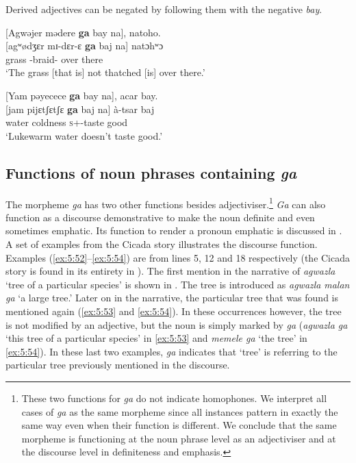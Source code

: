 Derived adjectives can be negated by following them with the negative \textit{bay}. 

\ea \label{ex:5:50}
{}[Agwəjer  mədere  \textbf{ga}  bay   na],  natoho.\\
\gll  {}[agʷødʒɛr  mɪ-dɛr-ɛ  \textbf{ga}  baj  na]  natɔhʷɔ\\
      grass  {\NOM}{}-braid-{\CL}  {\ADJ}  {\NEG}  {\PSP}  {over there}\\
\glt  ‘The grass [that is] not thatched [is] over there.’
\z

\ea \label{ex:5:51}
{}[Yam  pəyecece  \textbf{ga}  bay   na],  acar  bay.\\
\gll  {}[jam  pijɛtʃɛtʃɛ   \textbf{ga}  baj  na]   à-tsar    baj\\
      water  coldness  {\ADJ}  {\NEG}  {\PSP}  {\textsc{s}+{\PFV}-taste good} {\NEG}\\
\glt  ‘Lukewarm water doesn’t taste good.’ 
\z

\subsection{Functions of noun phrases containing \textit{ga}}
\hypertarget{RefHeading1211701525720847}{}
The morpheme \textit{ga} has two other functions besides adjectiviser.\footnote{These two functions for \textit{ga} do not indicate homophones. We interpret all cases of \textit{ga} as the same morpheme since all instances pattern in exactly the same way even when their function is different. We conclude that the same morpheme is functioning at the noun phrase level as an adjectiviser and at the discourse level in definiteness and emphasis.}  \textit{Ga} can also function as a discourse demonstrative to make the noun definite and even sometimes emphatic.  Its function to render a pronoun emphatic is discussed in .  A set of examples from the Cicada story illustrates the discourse function. Examples (\ref{ex:5:52}--\ref{ex:5:54}) are from lines 5, 12 and 18 respectively  (the Cicada story is found in its entirety in ). The first mention in the narrative of \textit{agwazla} ‘tree of a particular species’ is shown in . The tree is introduced as \textit{agwazla} \textit{malan} \textit{ga}  ‘a large tree.’ Later on in the narrative, the particular tree that was found is mentioned again (\ref{ex:5:53} and \ref{ex:5:54}). In these occurrences however, the tree is not modified by an adjective, but the noun is simply marked by \textit{ga} (\textit{agwazla ga} ‘this tree of a particular species’ in \ref{ex:5:53} and \textit{memele ga} ‘the tree’ in \ref{ex:5:54}). In these last two examples, \textit{ga} indicates that ‘tree’ is referring to the particular tree previously mentioned in the discourse. 


